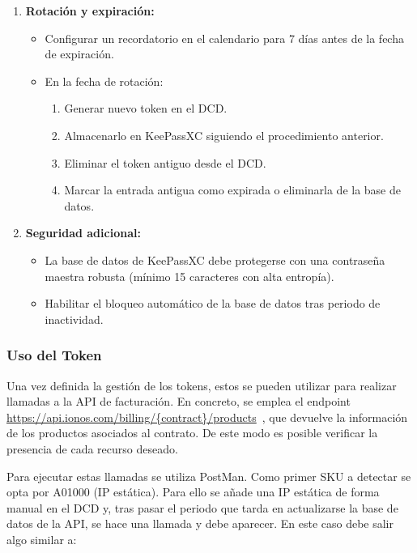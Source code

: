 \begin{enumerate}
    \item \textbf{Rotación y expiración:}
          \begin{itemize}
              \item Configurar un recordatorio en el calendario para 7 días antes de la fecha de expiración.
              \item En la fecha de rotación:
                    \begin{enumerate}
                        \item Generar nuevo token en el DCD.
                        \item Almacenarlo en KeePassXC siguiendo el procedimiento anterior.
                        \item Eliminar el token antiguo desde el DCD.
                        \item Marcar la entrada antigua como expirada o eliminarla de la base de datos.
                    \end{enumerate}
          \end{itemize}

    \item \textbf{Seguridad adicional:}
          \begin{itemize}
              \item La base de datos de KeePassXC debe protegerse con una contraseña maestra robusta (mínimo 15 caracteres con alta entropía).
              \item Habilitar el bloqueo automático de la base de datos tras periodo de inactividad.
          \end{itemize}
\end{enumerate}

\subsubsection{Uso del Token}

Una vez definida la gestión de los tokens, estos se pueden utilizar para realizar llamadas a la API de facturación. En concreto, se emplea el endpoint \url{https://api.ionos.com/billing/{contract}/products}~\cite{billing-IONOSCloud}, que devuelve la información de los productos asociados al contrato. De este modo es posible verificar la presencia de cada recurso deseado.

Para ejecutar estas llamadas se utiliza PostMan.
Como primer SKU a detectar se opta por A01000 (IP estática). Para ello se añade una IP estática de forma manual en el DCD y, tras pasar el periodo que tarda en actualizarse
la base de datos de la API, se hace una llamada y debe aparecer. En este caso debe salir algo similar a:

